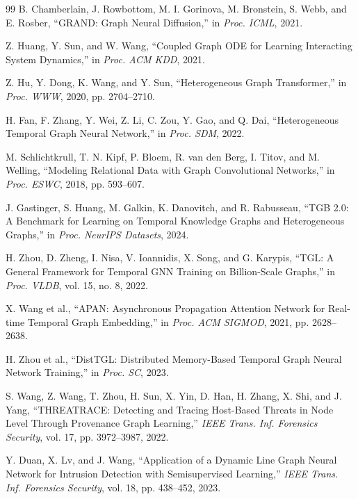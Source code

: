 \documentclass[journal]{IEEEtran}
\theoremstyle{plain}
\theoremstyle{definition}
\theoremstyle{remark}
\begin{document}
\begin{thebibliography}{99}
B. Chamberlain, J. Rowbottom, M. I. Gorinova, M. Bronstein, S. Webb, and E. Rosber, ``GRAND: Graph Neural Diffusion,'' in \textit{Proc. ICML}, 2021.

Z. Huang, Y. Sun, and W. Wang, ``Coupled Graph ODE for Learning Interacting System Dynamics,'' in \textit{Proc. ACM KDD}, 2021.

Z. Hu, Y. Dong, K. Wang, and Y. Sun, ``Heterogeneous Graph Transformer,'' in \textit{Proc. WWW}, 2020, pp. 2704--2710.

H. Fan, F. Zhang, Y. Wei, Z. Li, C. Zou, Y. Gao, and Q. Dai, ``Heterogeneous Temporal Graph Neural Network,'' in \textit{Proc. SDM}, 2022.

M. Schlichtkrull, T. N. Kipf, P. Bloem, R. van den Berg, I. Titov, and M. Welling, ``Modeling Relational Data with Graph Convolutional Networks,'' in \textit{Proc. ESWC}, 2018, pp. 593--607.

J. Gastinger, S. Huang, M. Galkin, K. Danovitch, and R. Rabusseau, ``TGB 2.0: A Benchmark for Learning on Temporal Knowledge Graphs and Heterogeneous Graphs,'' in \textit{Proc. NeurIPS Datasets}, 2024.

H. Zhou, D. Zheng, I. Nisa, V. Ioannidis, X. Song, and G. Karypis, ``TGL: A General Framework for Temporal GNN Training on Billion-Scale Graphs,'' in \textit{Proc. VLDB}, vol. 15, no. 8, 2022.

X. Wang et al., ``APAN: Asynchronous Propagation Attention Network for Real-time Temporal Graph Embedding,'' in \textit{Proc. ACM SIGMOD}, 2021, pp. 2628--2638.

H. Zhou et al., ``DistTGL: Distributed Memory-Based Temporal Graph Neural Network Training,'' in \textit{Proc. SC}, 2023.

S. Wang, Z. Wang, T. Zhou, H. Sun, X. Yin, D. Han, H. Zhang, X. Shi, and J. Yang, ``THREATRACE: Detecting and Tracing Host-Based Threats in Node Level Through Provenance Graph Learning,'' \textit{IEEE Trans. Inf. Forensics Security}, vol. 17, pp. 3972--3987, 2022.

Y. Duan, X. Lv, and J. Wang, ``Application of a Dynamic Line Graph Neural Network for Intrusion Detection with Semisupervised Learning,'' \textit{IEEE Trans. Inf. Forensics Security}, vol. 18, pp. 438--452, 2023.


\end{thebibliography}
\end{document}
